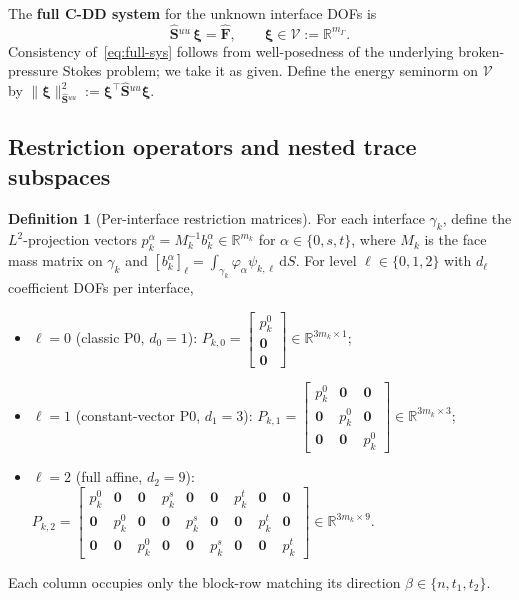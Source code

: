 \documentclass[11pt,a4paper]{article}
\theoremstyle{definition}
\newtheorem{definition}[theorem]{Definition}
\newcommand{\R}{\mathbb{R}}
\newcommand{\iface}{\gamma}
\newcommand{\Schur}{\mathbf{S}}
\newcommand{\Shatuu}{\widehat{\Schur}{}^{uu}}
\newcommand{\Fhat}{\widehat{\bm{F}}}
\newcommand{\zero}{\bm{0}}
\newcommand{\Vspace}{\mathcal{V}}
\begin{document}
The \textbf{full C-DD system} for the unknown interface DOFs is
\begin{equation}\label{eq:full-sys}
  \Shatuu\,\bm{\xi} = \Fhat,\qquad \bm{\xi}\in\Vspace:=\R^{m_\Gamma}.
\end{equation}
Consistency of~\eqref{eq:full-sys} follows from well-posedness of the
underlying broken-pressure Stokes problem; we take it as given.
Define the energy seminorm on $\Vspace$ by
$\|\bm{\xi}\|_{\Shatuu}^2 := \bm{\xi}^\top \Shatuu \bm{\xi}$.

\subsection{Restriction operators and nested trace subspaces}

\begin{definition}[Per-interface restriction matrices]\label{def:Pkl}
  For each interface $\iface_k$, define the $L^2$-projection vectors
  $p_k^\alpha = M_k^{-1} b_k^\alpha \in \R^{m_k}$ for
  $\alpha\in\{0,s,t\}$, where
  $M_k$ is the face mass matrix on $\iface_k$ and
  $[b_k^\alpha]_\ell = \int_{\iface_k} \varphi_\alpha\psi_{k,\ell}\,\mathrm{d}S$.
  For level $\ell\in\{0,1,2\}$ with $d_\ell$ coefficient DOFs per interface,
  \begin{itemize}
    \item $\ell=0$ (classic P0, $d_0=1$):
      $P_{k,0} = \begin{bmatrix} p_k^0 \\ \zero \\ \zero \end{bmatrix}
       \in \R^{3m_k\times 1}$;
    \item $\ell=1$ (constant-vector P0, $d_1=3$):
      $P_{k,1} = \begin{bmatrix}
        p_k^0 & \zero   & \zero   \\
        \zero & p_k^0   & \zero   \\
        \zero & \zero   & p_k^0
      \end{bmatrix} \in \R^{3m_k\times 3}$;
    \item $\ell=2$ (full affine, $d_2=9$):
      $P_{k,2} = \begin{bmatrix}
        p_k^0 & \zero & \zero & p_k^s & \zero & \zero & p_k^t & \zero & \zero \\[2pt]
        \zero & p_k^0 & \zero & \zero & p_k^s & \zero & \zero & p_k^t & \zero \\[2pt]
        \zero & \zero & p_k^0 & \zero & \zero & p_k^s & \zero & \zero & p_k^t
      \end{bmatrix} \in \R^{3m_k\times 9}$.
  \end{itemize}
  Each column occupies only the block-row matching its direction
  $\beta\in\{n,t_1,t_2\}$.
\end{definition}
\end{document}
